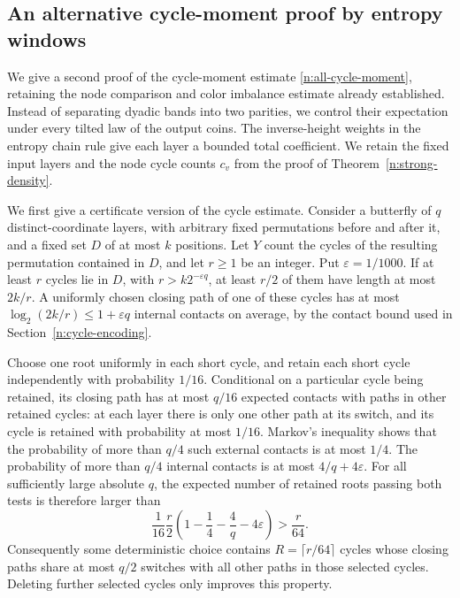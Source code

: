 \subsection{An alternative cycle-moment proof by entropy windows}
\label{n:coherent-window-route}

We give a second proof of the cycle-moment estimate
\eqref{n:all-cycle-moment}, retaining the node comparison and color
imbalance estimate already established.
Instead of separating dyadic bands into two parities, we control
their expectation under every tilted law of the output coins.  The
inverse-height weights in the entropy chain rule give each layer a
bounded total coefficient.  We retain the fixed input layers and the node cycle counts
$c_v$ from the proof of Theorem~\ref{n:strong-density}.

We first give a certificate version of the cycle estimate.  Consider
a butterfly of $q$ distinct-coordinate layers, with arbitrary fixed
permutations before and after it, and a fixed set $D$ of at most $k$
positions.  Let $Y$ count the cycles of the resulting permutation
contained in $D$, and let $r\ge1$ be an integer.
Put $\varepsilon=1/1000$.  If at least $r$ cycles lie in
$D$, with $r>k2^{-\varepsilon q}$, at least $r/2$ of them have
length at most $2k/r$.  A uniformly chosen closing path of one of
these cycles has at most $\log_2(2k/r)\le1+\varepsilon q$
internal contacts on average, by the contact bound used in
Section~\ref{n:cycle-encoding}.

Choose one root uniformly in each short cycle, and retain each
short cycle independently with probability $1/16$.  Conditional on
a particular cycle being retained, its closing path has at most
$q/16$ expected contacts with paths in other retained cycles:
at each layer there is only one other path at its switch, and its
cycle is retained with probability at most $1/16$.  Markov's
inequality shows that the probability of more than $q/4$ such
external contacts is at most $1/4$.  The probability of more than
$q/4$ internal contacts is at most $4/q+4\varepsilon$.
For all sufficiently large absolute $q$, the expected number of
retained roots passing both tests is therefore larger than
\[
 \frac1{16}\frac r2
          \left(1-\frac14-\frac4q-4\varepsilon\right)
 >\frac r{64}.
\]
Consequently some deterministic choice contains
$R=\lceil r/64\rceil$ cycles whose closing paths share at most
$q/2$ switches with all other paths in those selected cycles.
Deleting further selected cycles only improves this property.

